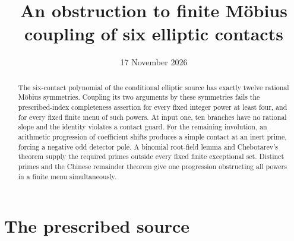 \documentclass[11pt,a4paper]{article}
\title{An obstruction to finite M\"obius coupling of six elliptic contacts}
\author{}\date{17 November 2026}
\begin{document}
\maketitle
\begin{abstract}
The six-contact polynomial of the conditional elliptic source has
exactly twelve rational M\"obius symmetries. Coupling its two arguments
by these symmetries fails the prescribed-index completeness assertion
for every fixed integer power at least four, and for every fixed finite
menu of such powers. At input one, ten branches have no rational slope
and the identity violates a contact guard. For the remaining involution,
an arithmetic progression of coefficient shifts produces a simple
contact at an inert prime, forcing a negative odd detector pole.
A binomial root-field lemma and Chebotarev's theorem supply the required
primes outside every fixed finite exceptional set. Distinct primes and
the Chinese remainder theorem give one progression obstructing all
powers in a finite menu simultaneously.
\end{abstract}

\section{The prescribed source}
\end{document}
